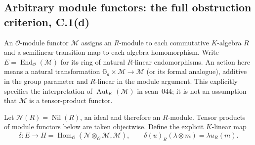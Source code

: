 \subsection{Arbitrary module functors: the full obstruction criterion, C.1(d)}
An $\mathcal O$-module functor $\mathcal M$ assigns an $R$-module to each commutative $K$-algebra $R$ and a semilinear transition map to each algebra homomorphism. Write $E=\operatorname{End}_{\mathcal O}(\mathcal M)$ for its ring of natural $R$-linear endomorphisms. An action here means a natural transformation $\mathbb G_a\times\mathcal M\to\mathcal M$ (or its formal analogue), additive in the group parameter and $R$-linear in the module argument. This explicitly specifies the interpretation of $\operatorname{Aut}_K(\mathcal M)$ in scan~044; it is not an assumption that $\mathcal M$ is a tensor-product functor.

Let $\mathcal N(R)=\operatorname{Nil}(R)$, an ideal and therefore an $R$-module. Tensor products of module functors below are taken objectwise. Define the explicit $K$-linear map
\[
\delta:E\longrightarrow
H=\operatorname{Hom}_{\mathcal O}(\mathcal N\otimes_{\mathcal O}\mathcal M,\mathcal M),
\qquad
\delta(u)_R(\lambda\otimes m)=\lambda u_R(m).
\]

